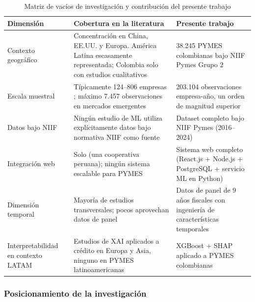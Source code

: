\documentclass[12pt, letterpaper]{article}
\begin{document}
\begin{table}[htbp]
\centering
\caption{Matriz de vac\'ios de investigaci\'on y contribuci\'on del presente trabajo}
\label{tab:vacios}
\small
\begin{tabularx}{\textwidth}{L{3cm} L{5.5cm} L{5.5cm}}
\toprule
\textbf{Dimensi\'on} & \textbf{Cobertura en la literatura} & \textbf{Presente trabajo} \\
\midrule
Contexto geogr\'afico & Concentraci\'on en China, EE.UU. y Europa. Am\'erica Latina escasamente representada; Colombia solo con estudios cualitativos \citep{HigueraVargas2021, CardonaZuleta2025} & 38.245 PYMES colombianas bajo NIIF Pymes Grupo 2 \\
\addlinespace
Escala muestral & T\'ipicamente 124--806 empresas \citep{Boumhidi2025, PtakChmielewska2020}; m\'aximo 7.457 observaciones en mercados emergentes \citep{Mahesh2025} & 203.104 observaciones empresa-a\~no, un orden de magnitud superior \\
\addlinespace
Datos bajo NIIF & Ning\'un estudio de ML utiliza expl\'icitamente datos bajo normativa NIIF como fuente & Dataset completo bajo NIIF Pymes (2016--2024) \\
\addlinespace
Integraci\'on web & Solo \citet{MayorgaLira2023} (una cooperativa peruana); ning\'un sistema escalable para PYMES & Sistema web completo (React.js + Node.js + PostgreSQL + servicio ML en Python) \\
\addlinespace
Dimensi\'on temporal & Mayor\'ia de estudios transversales; pocos aprovechan datos de panel \citep{Bortolotti2024, Mahesh2025} & Datos de panel de 9 a\~nos fiscales con ingenier\'ia de caracter\'isticas temporales \\
\addlinespace
Interpretabilidad en contexto LATAM & Estudios de XAI aplicados a cr\'edito en Europa \citep{Bussmann2020} y Asia, ninguno en PYMES latinoamericanas & XGBoost + SHAP aplicado a PYMES colombianas \\
\bottomrule
\end{tabularx}
\end{table}

\subsubsection{Posicionamiento de la investigaci\'on}
\end{document}
